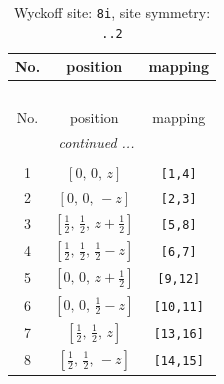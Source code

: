 \documentclass[fleqn,8pt]{jsarticle}
\begin{document}
\begin{longtable}{ccc}
\caption{Wyckoff site: {\tt 8i}, site symmetry: {\tt ..2}}
 \\
 \hline \hline
No. & position & mapping \\ \hline \endfirsthead

\multicolumn{2}{l}{\tablename\ \thetable{}} \\
 \hline \hline
No. & position & mapping \\ \hline \endhead

 \hline \hline
\multicolumn{2}{r}{\footnotesize\it continued ...} \\ \endfoot

 \hline \hline
\multicolumn{2}{r}{} \\ \endlastfoot

1 & $\left[ 0,\, 0,\, z \right]$ & {\tt [1,4]} \\ \hline
2 & $\left[ 0,\, 0,\, - z \right]$ & {\tt [2,3]} \\ \hline
3 & $\left[ \frac{1}{2},\, \frac{1}{2},\, z + \frac{1}{2} \right]$ & {\tt [5,8]} \\ \hline
4 & $\left[ \frac{1}{2},\, \frac{1}{2},\, \frac{1}{2} - z \right]$ & {\tt [6,7]} \\ \hline
5 & $\left[ 0,\, 0,\, z + \frac{1}{2} \right]$ & {\tt [9,12]} \\ \hline
6 & $\left[ 0,\, 0,\, \frac{1}{2} - z \right]$ & {\tt [10,11]} \\ \hline
7 & $\left[ \frac{1}{2},\, \frac{1}{2},\, z \right]$ & {\tt [13,16]} \\ \hline
8 & $\left[ \frac{1}{2},\, \frac{1}{2},\, - z \right]$ & {\tt [14,15]} \\
\end{longtable}
\renewcommand{\arraystretch}{1.2}
\end{document}
